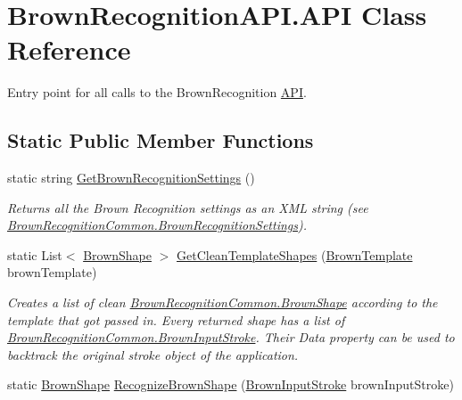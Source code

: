 \hypertarget{class_brown_recognition_a_p_i_1_1_a_p_i}{
\section{\-Brown\-Recognition\-A\-P\-I.\-A\-P\-I \-Class \-Reference}
\label{class_brown_recognition_a_p_i_1_1_a_p_i}
}


\-Entry point for all calls to the \-Brown\-Recognition \hyperlink{class_brown_recognition_a_p_i_1_1_a_p_i}{\-A\-P\-I}.  


\subsection*{\-Static \-Public \-Member \-Functions}
\begin{DoxyCompactItemize}
\item 
static string \hyperlink{class_brown_recognition_a_p_i_1_1_a_p_i_ac40d9358eb8dc39addc178098afabe13}{\-Get\-Brown\-Recognition\-Settings} ()
\begin{DoxyCompactList}\small\item\em \-Returns all the \-Brown \-Recognition settings as an \-X\-M\-L string (see \hyperlink{class_brown_recognition_common_1_1_brown_recognition_settings}{\-Brown\-Recognition\-Common.\-Brown\-Recognition\-Settings}). \end{DoxyCompactList}\item 
static \-List$<$ \hyperlink{class_brown_recognition_common_1_1_brown_shape}{\-Brown\-Shape} $>$ \hyperlink{class_brown_recognition_a_p_i_1_1_a_p_i_ac7a7ade4b50ffe3e1b6608a8ced64560}{\-Get\-Clean\-Template\-Shapes} (\hyperlink{class_brown_recognition_common_1_1_brown_template}{\-Brown\-Template} brown\-Template)
\begin{DoxyCompactList}\small\item\em \-Creates a list of clean \hyperlink{class_brown_recognition_common_1_1_brown_shape}{\-Brown\-Recognition\-Common.\-Brown\-Shape} according to the template that got passed in. \-Every returned shape has a list of \hyperlink{class_brown_recognition_common_1_1_brown_input_stroke}{\-Brown\-Recognition\-Common.\-Brown\-Input\-Stroke}. \-Their \-Data property can be used to backtrack the original stroke object of the application. \end{DoxyCompactList}\item 
static \hyperlink{class_brown_recognition_common_1_1_brown_shape}{\-Brown\-Shape} \hyperlink{class_brown_recognition_a_p_i_1_1_a_p_i_ac7688bb14d67362c0b3082279dff8d51}{\-Recognize\-Brown\-Shape} (\hyperlink{class_brown_recognition_common_1_1_brown_input_stroke}{\-Brown\-Input\-Stroke} brown\-Input\-Stroke)

\end{DoxyCompactItemize}
